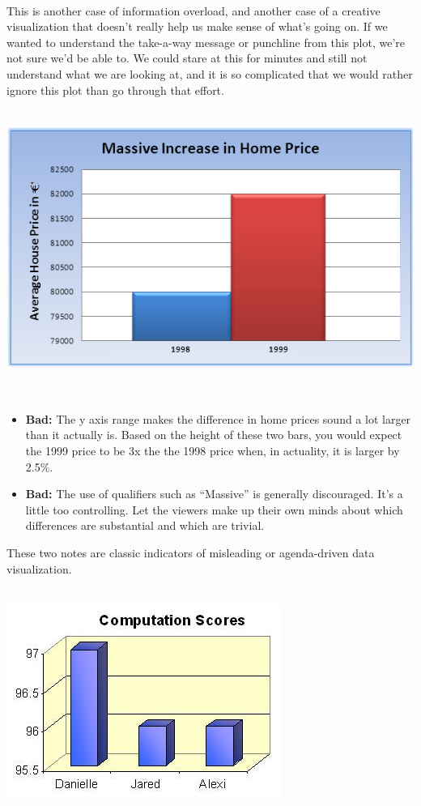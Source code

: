 \documentclass[
]{book}
\begin{document}
~

This is another case of information overload, and another case of a creative visualization that doesn't really help us make sense of what's going on. If we wanted to understand the take-a-way message or punchline from this plot, we're not sure we'd be able to. We could stare at this for minutes and still not understand what we are looking at, and it is so complicated that we would rather ignore this plot than go through that effort.

~\\

\includegraphics{img/vis11.png}

~

\begin{itemize}
\item
  \textbf{Bad:} The y axis range makes the difference in home prices sound a lot larger than it actually is. Based on the height of these two bars, you would expect the 1999 price to be 3x the the 1998 price when, in actuality, it is larger by 2.5\%.
\item
  \textbf{Bad:} The use of qualifiers such as ``Massive'' is generally discouraged. It's a little too controlling. Let the viewers make up their own minds about which differences are substantial and which are trivial.
\end{itemize}

These two notes are classic indicators of misleading or agenda-driven data visualization.

~\\

\includegraphics{img/vis12.jpg}
\end{document}
